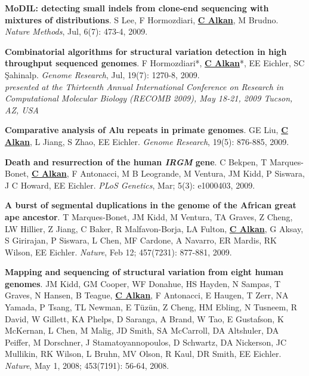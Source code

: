 \vspace{-.2cm}
{\bf MoDIL: detecting small indels from clone-end sequencing with mixtures of distributions}.
S Lee, F Hormozdiari, {\bf {\underline{C Alkan}}}, M Brudno.
{\em Nature Methods},  Jul, 6(7): 473-4, 2009.

\clearpage
\vspace{-.2cm}
{\bf  Combinatorial algorithms for structural variation detection in high throughput sequenced genomes}.
F Hormozdiari*, {\bf {\underline{C Alkan}}}*, EE Eichler, SC \c{S}ahinalp. 
{\em Genome Research}, Jul, 19(7): 1270-8, 2009.\\
\hspace*{1cm} {\footnotesize {\it presented at the
 Thirteenth Annual International Conference on Research in Computational Molecular 
Biology (RECOMB 2009), May 18-21, 2009 Tucson, AZ, USA}}



\vspace{-.2cm}

{\bf Comparative analysis of Alu repeats in primate genomes}.  GE Liu, {\bf {\underline{C Alkan}}}, L Jiang, S Zhao, EE Eichler. 
{\em Genome Research}, 19(5): 876-885, 2009.




\vspace{-.2cm}
{\bf Death and resurrection of the human {\em IRGM} gene}. C Bekpen, T Marques-Bonet,
{\bf {\underline{C Alkan}}}, F Antonacci, M B Leogrande, M Ventura, JM Kidd, P Siswara, J C Howard, EE Eichler. {\em PLoS Genetics}, Mar; 5(3): e1000403, 2009.

\vspace{-.2cm}

{\bf A burst of segmental duplications in the genome of the African great ape ancestor}. T Marques-Bonet, JM Kidd, M Ventura, TA Graves, Z Cheng, LW Hillier, Z Jiang, 
C Baker, R Malfavon-Borja, LA Fulton, {\bf {\underline{C Alkan}}}, G Aksay, S Girirajan,
 P Siswara, L Chen, MF Cardone, A Navarro, ER Mardis,
 RK Wilson, EE Eichler. {\em Nature}, Feb 12; 457(7231): 877-881, 2009.


\vspace{-.2cm}
 {\bf Mapping and sequencing of structural variation from eight human genomes}.
 JM Kidd, GM Cooper, WF Donahue, HS Hayden, 
 N Sampas, T Graves, N Hansen, B Teague, {\bf {\underline{C Alkan}}},  F Antonacci, 
 E Haugen, T Zerr, NA Yamada, P Tsang,  TL Newman, E T\"{u}z\"{u}n, 
 Z Cheng, HM Ebling, N Tusneem, R David, W Gillett, KA Phelps, 
 D Saranga, A Brand, W Tao, E Gustafson, K McKernan, L Chen, 
 M Malig, JD Smith, SA McCarroll, DA Altshuler,  
 DA Peiffer, M Dorschner, J Stamatoyannopoulos, D Schwartz,  
 DA Nickerson, JC Mullikin, RK Wilson, L Bruhn, 
 MV Olson, R Kaul, DR Smith, EE Eichler.
 {\em Nature}, May 1, 2008; 453(7191): 56-64, 2008.


